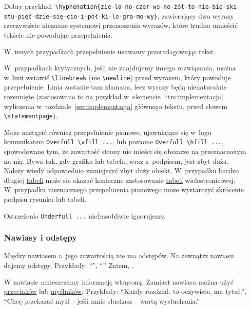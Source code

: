 Dobry przykład: \verb+\hyphenation{zie-lo-no-czer-wo-no-żół-to-nie-bie-ski+ \verb+stu-pięć-dzie-się-cio-i-pół-ki-lo-gra-mo-wy}+, zawierający dwa wyrazy rzeczywiście nieznane systemowi przenoszenia wyrazów, które trudno umieścić tekście nie powodując przepełnienia.

W~innych przypadkach przepełnienie usuwamy przeredagowując tekst.

W~przypadkach krytycznych, jeśli nie znajdujemy innego rozwiązania, można w~linii wstawić \verb+\linebreak+ (nie \verb+\newline+) przed wyrazem, który powoduje przepełnienie. Linia zostanie tam złamana, lecz wyrazy będą nienaturalnie rozsunięte (zastosowano to na przykład w~elemencie~\ref{itm:implementacja} wyliczenia w~rozdziale~\ref{sec:implementacja} głównego tekstu, przed słowem \verb+\statementpage+). 

Może nastąpić również przepełnienie pionowe, ujawniające się w~logu komunikatem\/ \verb+Overfull \vfill ...+, lub poziome\/ \verb+Overfull \hfill ...+, spowodowane tym, że zawartość strony nie mieści się obszarze na przeznaczonym na nią. Bywa tak, gdy grafika lub tabela, wraz z~podpisem, jest zbyt duża. Należy wtedy odpowiednio zmniejszyć zbyt duży obiekt. W~przypadku bardzo długiej \hyperref[sec:dod:tabela]{tabeli} może sie okazać konieczne zastosowanie \hyperref[sec:dod:tabela]{tabeli} wielostronicowej. W~przypadku nieznacznego przepełnienia pionowego może wystarczyć skrócenie podpisu rysunku lub tabeli.

Ostrzeżenia \verb+Underfull ...+ niefrasobliwie ignorujemy.


\subsubsection{Nawiasy i odstępy}
\label{sec:dod:nawiasy}

Między nawiasem a~jego zawartością nie ma odstępów. Na zewnątrz nawiasu dajemy odstępy. Przykłady: ``'', ``'' Zatem, .

W nawiasie umieszczamy informację wtrąconą. Zamiast nawiasu można użyć \hyperref[sec:dod:pisownia-interpunkcja]{przecinków} lub \hyperref[sec:dod:myslnik-minus-dywiz]{myślników}. Przykłady: ``Każdy rozdział, to oczywiste, ma tytuł.'', ``Chcę przekazać myśl -- jeśli mnie słuchasz -- wartą wysłuchania.''

